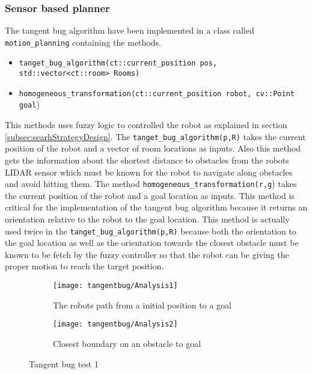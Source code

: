\documentclass[../Head/Main.tex]{subfiles}
\begin{document}
\subsubsection{Sensor based planner}
\label{subsubsec:tangentBug}
The tangent bug algorithm have been implemented in a class called \texttt{motion\_planning} containing the methods.
\begin{itemize}
	\item \texttt{tanget\_bug\_algorithm(ct::current\_position pos, std::vector<ct::room> Rooms)}
	\item \texttt{homogeneous\_transformation(ct::current\_position robot, cv::Point goal})
\end{itemize}
This methods uses fuzzy logic to controlled the robot as explained in section \ref{subsec:searhStrategyDesign}. The \texttt{tanget\_bug\_algorithm(p,R)} takes the current position of the robot and a vector of room locations as inputs. Also this method gets the information about the shortest distance to obstacles from the robots LIDAR sensor which must be known for the robot to navigate along obstacles and avoid hitting them. The method \texttt{homogeneous\_transformation(r,g}) takes the current position of the robot and a goal location as inputs. This method is critical for the implementation of the tangent bug algorithm because it returns an orientation relative to the robot to the goal location. This method is actually used twice in the \texttt{tanget\_bug\_algorithm(p,R)} because both the orientation to the goal location as well as the orientation towards the closest obstacle must be known to be fetch by the fuzzy controller so that the robot can be giving the proper motion to reach the target position. 

\begin{figure}[H]
  \begin{subfigure}[b]{0.59\textwidth}
    \centering
    \texttt{[image: tangentbug/Analysis1]}
    \caption{The robots path from a initial position to a goal}
    \label{fig:tangentBugRobotPath1}
  \end{subfigure}
  \hfill
   \begin{subfigure}[b]{0.39\textwidth}
    \centering
    \texttt{[image: tangentbug/Analysis2]}
    \caption{Closest boundary on an obstacle to goal}
    \label{fig:closestBoundaryOnObstacle1}
  \end{subfigure}
  \caption{Tangent bug test 1}
  \end{figure}
  
\end{document}
